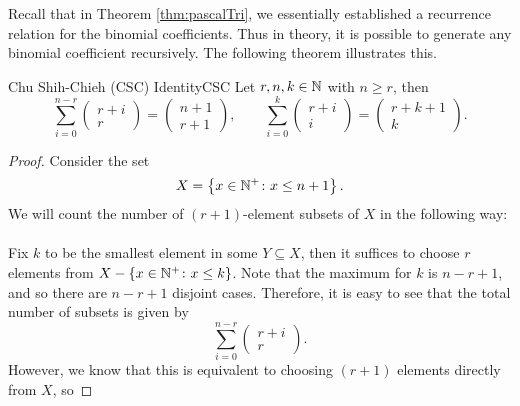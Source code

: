 \documentclass[math]{amznotes}
\theoremstyle{remark}
\begin{document}
Recall that in Theorem \ref{thm:pascalTri}, we essentially established a recurrence relation for the binomial coefficients. Thus in theory, it is possible to generate any binomial coefficient recursively. The following theorem illustrates this.
\begin{thmbox}{Chu Shih-Chieh (CSC) Identity}{CSC}
    Let $r, n, k \in \mathbb{N}$ with $n \geq r$, then
    \begin{equation*}
        \sum_{i = 0}^{n - r}\begin{pmatrix}
            r + i \\
            r
        \end{pmatrix} = \begin{pmatrix}
            n + 1 \\
            r + 1
        \end{pmatrix}, \qquad \sum_{i = 0}^{k}\begin{pmatrix}
            r + i \\
            i
        \end{pmatrix} = \begin{pmatrix}
            r + k + 1 \\
            k
        \end{pmatrix}.
    \end{equation*}
    \tcblower
    \begin{proof}
        Consider the set
        \begin{displaymath}
            X = \left\{x \in \mathbb{N}^+ \colon x \leq n + 1\right\}.
        \end{displaymath}
        We will count the number of $(r + 1)$-element subsets of $X$ in the following way:
        \\\\
        Fix $k$ to be the smallest element in some $Y \subseteq X$, then it suffices to choose $r$ elements from $X - \left\{x \in \mathbb{N}^+ \colon x \leq k\right\}$. Note that the maximum for $k$ is $n - r + 1$, and so there are $n - r + 1$ disjoint cases. Therefore, it is easy to see that the total number of subsets is given by
        \begin{displaymath}
            \sum_{i = 0}^{n - r}\begin{pmatrix}
                r + i \\
                r
            \end{pmatrix}.
        \end{displaymath}
        However, we know that this is equivalent to choosing $(r + 1)$ elements directly from $X$, so

\end{proof}
\end{thmbox}
\end{document}

